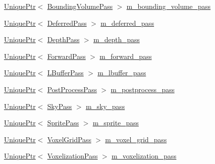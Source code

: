 \begin{DoxyCompactItemize}
\item 
\hyperlink{namespacemage_a3316d7143a973e37adf1110f2e80ca31}{Unique\+Ptr}$<$ \hyperlink{classmage_1_1rendering_1_1_bounding_volume_pass}{Bounding\+Volume\+Pass} $>$ \hyperlink{classmage_1_1rendering_1_1_renderer_1_1_impl_adeb573b3a2780e7c8af6fda3e073f90b}{m\+\_\+bounding\+\_\+volume\+\_\+pass}
\item 
\hyperlink{namespacemage_a3316d7143a973e37adf1110f2e80ca31}{Unique\+Ptr}$<$ \hyperlink{classmage_1_1rendering_1_1_deferred_pass}{Deferred\+Pass} $>$ \hyperlink{classmage_1_1rendering_1_1_renderer_1_1_impl_acab2b5fe9403dd1a7643ae91e8a0433d}{m\+\_\+deferred\+\_\+pass}
\item 
\hyperlink{namespacemage_a3316d7143a973e37adf1110f2e80ca31}{Unique\+Ptr}$<$ \hyperlink{classmage_1_1rendering_1_1_depth_pass}{Depth\+Pass} $>$ \hyperlink{classmage_1_1rendering_1_1_renderer_1_1_impl_a6774962f06bc28a23ac7e34d8891bb24}{m\+\_\+depth\+\_\+pass}
\item 
\hyperlink{namespacemage_a3316d7143a973e37adf1110f2e80ca31}{Unique\+Ptr}$<$ \hyperlink{classmage_1_1rendering_1_1_forward_pass}{Forward\+Pass} $>$ \hyperlink{classmage_1_1rendering_1_1_renderer_1_1_impl_aa62d3e015ddcc7b48d423ad0e55a82d7}{m\+\_\+forward\+\_\+pass}
\item 
\hyperlink{namespacemage_a3316d7143a973e37adf1110f2e80ca31}{Unique\+Ptr}$<$ \hyperlink{classmage_1_1rendering_1_1_l_buffer_pass}{L\+Buffer\+Pass} $>$ \hyperlink{classmage_1_1rendering_1_1_renderer_1_1_impl_a82455409a99a11e84de943181138e33e}{m\+\_\+lbuffer\+\_\+pass}
\item 
\hyperlink{namespacemage_a3316d7143a973e37adf1110f2e80ca31}{Unique\+Ptr}$<$ \hyperlink{classmage_1_1rendering_1_1_post_process_pass}{Post\+Process\+Pass} $>$ \hyperlink{classmage_1_1rendering_1_1_renderer_1_1_impl_a243257571f0f32cdc401b73d9b39587c}{m\+\_\+postprocess\+\_\+pass}
\item 
\hyperlink{namespacemage_a3316d7143a973e37adf1110f2e80ca31}{Unique\+Ptr}$<$ \hyperlink{classmage_1_1rendering_1_1_sky_pass}{Sky\+Pass} $>$ \hyperlink{classmage_1_1rendering_1_1_renderer_1_1_impl_afc248fa0b293e9cbd2d0045c4caa7d26}{m\+\_\+sky\+\_\+pass}
\item 
\hyperlink{namespacemage_a3316d7143a973e37adf1110f2e80ca31}{Unique\+Ptr}$<$ \hyperlink{classmage_1_1rendering_1_1_sprite_pass}{Sprite\+Pass} $>$ \hyperlink{classmage_1_1rendering_1_1_renderer_1_1_impl_a38a33ead382177e950db18795601723a}{m\+\_\+sprite\+\_\+pass}
\item 
\hyperlink{namespacemage_a3316d7143a973e37adf1110f2e80ca31}{Unique\+Ptr}$<$ \hyperlink{classmage_1_1rendering_1_1_voxel_grid_pass}{Voxel\+Grid\+Pass} $>$ \hyperlink{classmage_1_1rendering_1_1_renderer_1_1_impl_ad0b4ff740d36e1723949213ab5ba74bc}{m\+\_\+voxel\+\_\+grid\+\_\+pass}
\item 
\hyperlink{namespacemage_a3316d7143a973e37adf1110f2e80ca31}{Unique\+Ptr}$<$ \hyperlink{classmage_1_1rendering_1_1_voxelization_pass}{Voxelization\+Pass} $>$ \hyperlink{classmage_1_1rendering_1_1_renderer_1_1_impl_a1701b11fe9fe100a033920b6e8617adb}{m\+\_\+voxelization\+\_\+pass}
\end{DoxyCompactItemize}


